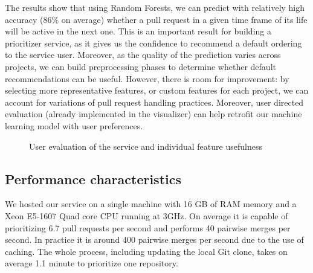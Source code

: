 \documentclass[conference]{IEEEtran}
\begin{document}
%

The results show that using Random Forests, we can predict with relatively
high accuracy (86\% on average) whether a pull request in a given time frame
of its life will be active in the next one. This is an important result
for building a prioritizer service, as it gives us the confidence to
recommend a default ordering to the service user. Moreover, as the
quality of the prediction varies across projects, we can build preprocessing
phases to determine whether default recommendations can be useful.
However, there is room for improvement: by selecting more representative
features, or custom features for each project, we can account for variations
of pull request handling practices. Moreover, user directed evaluation (already
implemented in the visualizer) can help retrofit our machine learning model
with user preferences.

\begin{figure}[t]
\centering
{}
\caption{User evaluation of the service and individual feature usefulness}
\label{fig:user-evaluation}
\end{figure}

\subsection{Performance characteristics}

We hosted our service on a single machine with 16 GB of RAM memory and a Xeon
E5-1607 Quad core CPU running at 3GHz. On average it is capable of prioritizing
6.7 pull requests per second and performs 40 pairwise merges per second. In
practice it is around 400 pairwise merges per second due to the use of caching.
The whole process, including updating the local Git clone, takes on average
1.1 minute to prioritize one repository.
\end{document}
